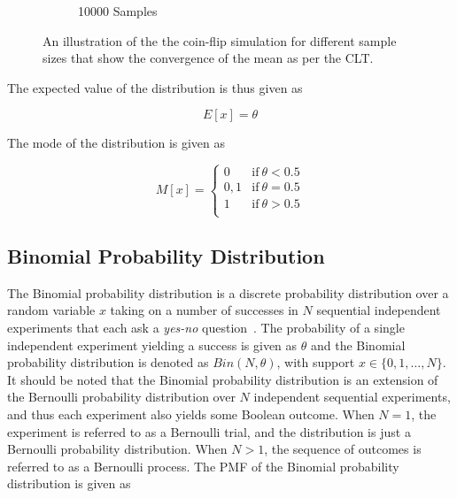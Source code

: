 \begin{figure}[htbp]
\begin{subfigure}{0.49\textwidth}
            \caption{10000 Samples}
            \label{fig:probability:probability_distributions:bernoulli:coin_10000}
      \end{subfigure}
      \par\bigskip
      \caption{An illustration of the the coin-flip simulation for different sample sizes that show the convergence of the mean as per the \acf{CLT}.}
      \label{fig:probability:probability_distributions:bernoulli:coin}
\end{figure}

The expected value of the distribution is thus given as

\begin{equation}
      \label{eq:probability:probability_distributions:bernoulli:expected_value}
      E[x] = \theta
\end{equation}

The mode of the distribution is given as

\begin{equation}
      \label{eq:probability:probability_distributions:bernoulli:mode}
      M[x] =
      \begin{cases}
            0   & \text{if}\ \theta < 0.5 \\
            0,1 & \text{if}\ \theta = 0.5 \\
            1   & \text{if}\ \theta > 0.5 \\
      \end{cases}
\end{equation}


\subsection{Binomial Probability Distribution}\label{sec:probability:probability_distributions:bin}


The Binomial probability distribution is a discrete probability distribution over a random variable $x$ taking on a number of successes in $N$ sequential independent experiments that each ask a \textit{yes-no} question~\cite{ref:wackerly:2014}. The probability of a single independent experiment yielding a success is given as $\theta$ and the Binomial probability distribution is denoted as $Bin(N, \theta)$, with support $x \in \{0, 1, \dots, N\}$.  It should be noted that the Binomial probability distribution is an extension of the Bernoulli probability distribution over $N$ independent sequential experiments, and thus each experiment also yields some Boolean outcome. When $N=1$, the experiment is referred to as a Bernoulli trial, and the distribution is just a Bernoulli probability distribution. When $N > 1$, the sequence of outcomes is referred to as a Bernoulli process. The \acs{PMF} of the Binomial probability distribution is given as


